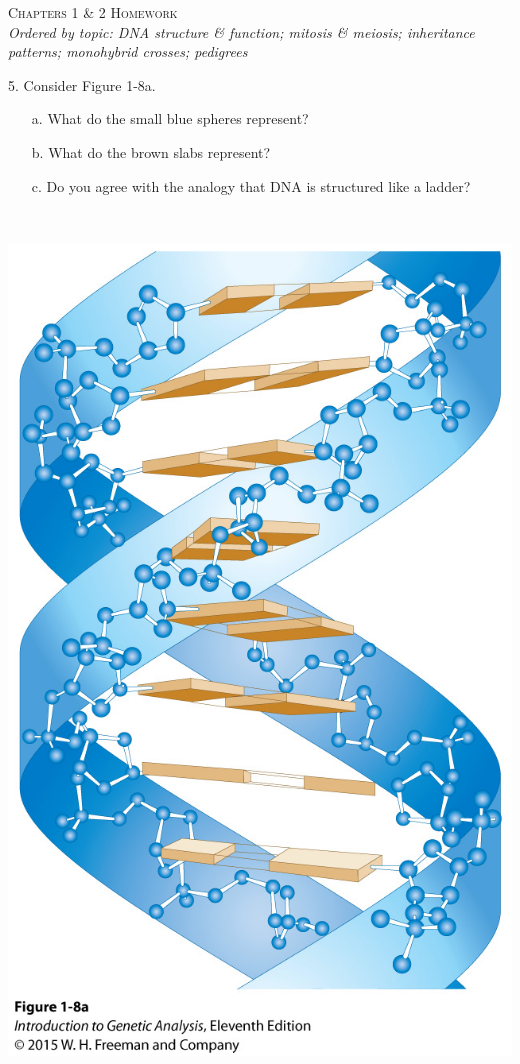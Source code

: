 \documentclass[11pt,]{article}
\begin{document}
\begin{center}
\Large{\textsc{Chapters 1 \& 2 Homework}}\\ \small{\textit{Ordered by
topic: DNA structure \& function; mitosis \& meiosis; inheritance
patterns; monohybrid crosses; pedigrees}}\\
\vspace*{\baselineskip}
\end{center}

\begin{blackbox}
5. Consider Figure 1-8a. \begin{enumerate} 
 \item[a.]{ What do the small blue spheres represent? } 
 \item[b.]{ What do the brown slabs represent? } 
 \item[c.]{ Do you agree with the analogy that DNA is structured like a ladder? } 
 \end{enumerate}

\


\begin{center}\includegraphics[width=0.25\linewidth,]{input/figure_01_08a} \end{center}


\vspace{11cm}

\end{blackbox}
\end{document}
